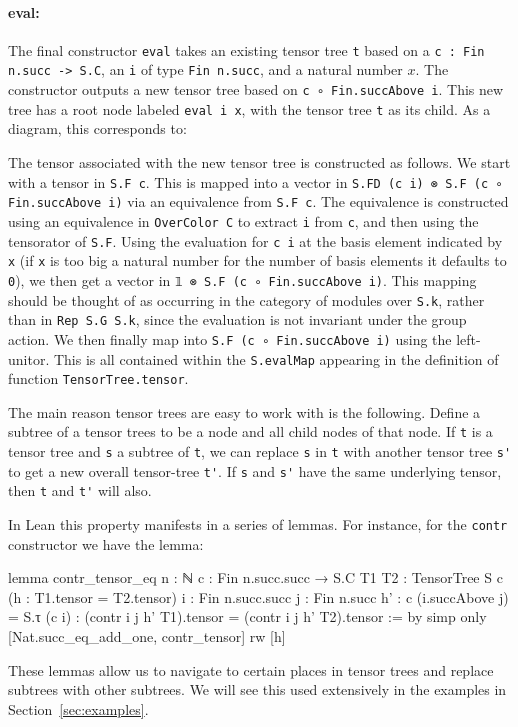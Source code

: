\documentclass[a4paper, 11pt]{article}
\DeclareRobustCommand{\myinline}{\lstinline}
\newcommand{\tensorTree}[1]{
\begin{center}
  \fcolorbox{mycolor}{white}{%
#1}
\end{center}
}
\begin{document}
\paragraph{eval:}
The final constructor \myinline|eval| takes an existing tensor tree \myinline|t| based on a \myinline|c : Fin n.succ -> S.C|,
an \myinline|i| of type \myinline|Fin n.succ|, and a natural number $x$.  
The constructor outputs a new tensor tree based on \myinline|c ∘ Fin.succAbove i|.
This new tree has a root node labeled \myinline|eval i x|, with the tensor tree \myinline|t| as its child.
As a diagram, this corresponds to:
\tensorTree{
  \begin{tikzpicture}
    \node[draw=black] (A) at (0,0) {\lstinline|eval i x|};
    \node (B) at (0,-1) {\lstinline|t|};
    \draw[->] (A) -- (B);
  \end{tikzpicture} 
}
The tensor associated with the new tensor tree is constructed as follows.
We start with a tensor in \myinline|S.F c|.
This is mapped into a vector in \myinline|S.FD (c i) ⊗ S.F (c ∘ Fin.succAbove i)| via an equivalence from
\myinline|S.F c|. The equivalence is constructed using an equivalence
in \myinline|OverColor C| to extract \myinline|i| from \myinline|c|, and
then using the tensorator of \myinline|S.F|.
Using the evaluation for \myinline|c i| at the basis element indicated by \myinline|x| (if \myinline|x| is too big a natural number for the number of basis elements it defaults to \myinline|0|), we then get a vector in
\myinline|𝟙 ⊗ S.F (c ∘ Fin.succAbove i)|.
This mapping should be thought of as occurring in the  category of modules over \myinline|S.k|, rather than in 
\myinline|Rep S.G S.k|, since the evaluation is not invariant under the group action.
We then finally map into \myinline|S.F (c ∘ Fin.succAbove i)| 
using the left-unitor. This is all contained within the \myinline|S.evalMap| appearing in the definition of
function \myinline|TensorTree.tensor|.

The main reason tensor trees are easy to work with is the following. 
Define a subtree of a tensor trees 
to be a node and all child nodes of that node. 
If \myinline|t| is a tensor tree and \myinline|s| a subtree of \myinline|t|, we can replace  \myinline|s| in \myinline|t| 
with another tensor tree \myinline|s'|
to get a new overall tensor-tree \myinline|t'|. If \myinline|s| and \myinline|s'| have the same underlying tensor, 
then \myinline|t| and \myinline|t'| will also. 

In Lean this property manifests in a series of lemmas. For instance,
for the \myinline|contr| constructor we have the lemma: 
\begin{code}
lemma contr_tensor_eq {n : ℕ} {c : Fin n.succ.succ → S.C} {T1 T2 : TensorTree S c}
    (h : T1.tensor = T2.tensor) {i : Fin n.succ.succ} {j : Fin n.succ}
    {h' : c (i.succAbove j) = S.τ (c i)} :
    (contr i j h' T1).tensor = (contr i j h' T2).tensor := by
  simp only [Nat.succ_eq_add_one, contr_tensor]
  rw [h]
\end{code}
These lemmas allow us to navigate to certain places in tensor trees and replace 
subtrees with other subtrees. We will see this used extensively in the examples in Section~\ref{sec:examples}. 
\end{document}
